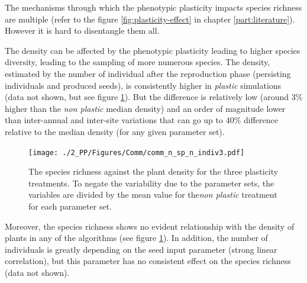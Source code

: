 The mechanisms through which the phenotypic plasticity impacts species richness are multiple (refer to the figure \ref{fig:plasticity-effect} in chapter \ref{part:literature}). However it is hard to disentangle them all.

The density can be affected by the phenotypic plasticity leading to higher species diversity\cite{lepik_high_2005}, leading to the sampling of more numerous species. The density, estimated by the number of individual after the reproduction phase (persisting individuals and produced seeds), is consistently higher in \textit{plastic} simulations (data not shown, but see figure \ref{fig:species_per_plant}). But the difference is relatively low (around 3\% higher than the \textit{non plastic} median density) and an order of magnitude lower than inter-annual and inter-site variations that can go up to 40\% difference relative to the median density (for any given parameter set).




\begin{figure}%
    \texttt{[image: ./2\_PP/Figures/Comm/comm\_n\_sp\_n\_indiv3.pdf]}%
  \caption[The species richness relative to the plant density]{The species richness against the plant density for the three plasticity treatments. To negate the variability due to the parameter sets, the variables are divided by the mean value for the\textit{non plastic} treatment for each parameter set.}
  \label{fig:species_per_plant}
\end{figure}

Moreover, the species richness shows no evident relationship with the density of plants in any of the algorithms (see figure \ref{fig:species_per_plant}). In addition, the number of individuals is greatly depending on the seed input parameter (strong linear correlation), but this parameter has no consistent effect on the species richness (data not shown).


